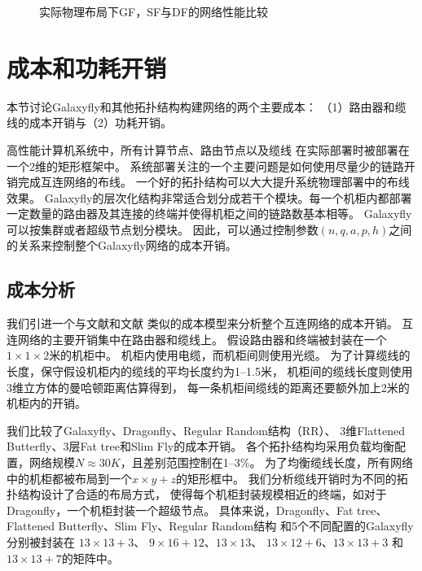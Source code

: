 \begin{figure}[t]
  \centering
  \begin{minipage}[t]{\textwidth}
    \centering
    \caption{实际物理布局下GF，SF与DF的网络性能比较}
    \label{fig:layouts}
  \end{minipage}
\end{figure}

\section{成本和功耗开销}
本节讨论Galaxyfly和其他拓扑结构构建网络的两个主要成本：
（1）路由器和缆线的成本开销与（2）功耗开销。

高性能计算机系统中，所有计算节点、路由节点以及缆线
在实际部署时被部署在一个2维的矩形框架中。
系统部署关注的一个主要问题是如何使用尽量少的链路开销完成互连网络的布线。
一个好的拓扑结构可以大大提升系统物理部署中的布线效果。
Galaxyfly的层次化结构非常适合划分成若干个模块。每一个机柜内都部署
一定数量的路由器及其连接的终端并使得机柜之间的链路数基本相等。
Galaxyfly可以按集群或者超级节点划分模块。
因此，可以通过控制参数$(n,q,a,p,h)$之间的关系来控制整个Galaxyfly网络的成本开销。

\subsection{成本分析}

我们引进一个与文献和文献
类似的成本模型来分析整个互连网络的成本开销。
互连网络的主要开销集中在路由器和缆线上。
假设路由器和终端被封装在一个$1 \times 1 \times 2$米的机柜中。
机柜内使用电缆，而机柜间则使用光缆。
为了计算缆线的长度，保守假设机柜内的缆线的平均长度约为1--1.5米，
机柜间的缆线长度则使用3维立方体的曼哈顿距离估算得到，
每一条机柜间缆线的距离还要额外加上2米的机柜内的开销。

我们比较了Galaxyfly、Dragonfly、Regular Random结构（RR）、
3维Flattened Butterfly、3层Fat tree和Slim Fly的成本开销。
各个拓扑结构均采用负载均衡配置，网络规模$N\approx30K$，且差别范围控制在1--3\%。
为了均衡缆线长度，所有网络中的机柜都被布局到一个$x\times y+z$的矩形框中。
我们分析缆线开销时为不同的拓扑结构设计了合适的布局方式，
使得每个机柜封装规模相近的终端，如对于Dragonfly，一个机柜封装一个超级节点。
具体来说，Dragonfly、Fat tree、Flattened Butterfly、Slim Fly、Regular Random结构
和5个不同配置的Galaxyfly分别被封装在
$13\times13+3$、 $9\times16+12$、$13\times13$、
$13\times12+6$、$13\times13+3$ 和$13\times13+7$的矩阵中。

